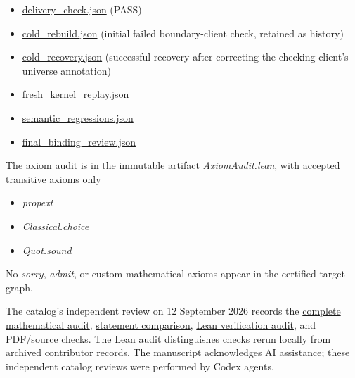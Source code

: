 \documentclass[11pt,a4paper]{article}
\providecommand{\tightlist}{\setlength{\itemsep}{0pt}\setlength{\parskip}{0pt}}
\begin{document}
\begin{itemize}
\tightlist
\item
  \href{https://github.com/yuningyang19/OpenProblemsInNLA_TR-01/blob/ed21181197ac839eac95f549404f94e7e3aa6e10/lean/audit/delivery_check.json}{delivery\_check.json}
  (PASS)
\item
  \href{https://github.com/yuningyang19/OpenProblemsInNLA_TR-01/blob/ed21181197ac839eac95f549404f94e7e3aa6e10/lean/audit/cold_rebuild.json}{cold\_rebuild.json}
  (initial failed boundary-client check, retained as history)
\item
  \href{https://github.com/yuningyang19/OpenProblemsInNLA_TR-01/blob/ed21181197ac839eac95f549404f94e7e3aa6e10/lean/audit/cold_recovery.json}{cold\_recovery.json}
  (successful recovery after correcting the checking client's universe
  annotation)
\item
  \href{https://github.com/yuningyang19/OpenProblemsInNLA_TR-01/blob/ed21181197ac839eac95f549404f94e7e3aa6e10/lean/audit/fresh_kernel_replay.json}{fresh\_kernel\_replay.json}
\item
  \href{https://github.com/yuningyang19/OpenProblemsInNLA_TR-01/blob/ed21181197ac839eac95f549404f94e7e3aa6e10/lean/audit/semantic_regressions.json}{semantic\_regressions.json}
\item
  \href{https://github.com/yuningyang19/OpenProblemsInNLA_TR-01/blob/ed21181197ac839eac95f549404f94e7e3aa6e10/lean/audit/final_binding_review.json}{final\_binding\_review.json}
\end{itemize}

The axiom audit is in the immutable artifact
\href{https://github.com/yuningyang19/OpenProblemsInNLA_TR-01/blob/ed21181197ac839eac95f549404f94e7e3aa6e10/lean/Problem56/PaperV7/AxiomAudit.lean}{\textit{AxiomAudit.lean}},
with accepted transitive axioms only

\begin{itemize}
\tightlist
\item
  \textit{propext}
\item
  \textit{Classical.choice}
\item
  \textit{Quot.sound}
\end{itemize}

No \textit{sorry}, \textit{admit}, or custom mathematical axioms appear
in the certified target graph.

The catalog's independent review on 12 September 2026 records the
\href{https://github.com/ajt60gaibb/OpenProblemsInNLA/blob/main/references/maintainer-review-2026-09-12-tr01/pr141-review.md}{complete
mathematical audit},
\href{https://github.com/ajt60gaibb/OpenProblemsInNLA/blob/main/references/maintainer-review-2026-09-12-tr01/pr141-statement-review.md}{statement
comparison},
\href{https://github.com/ajt60gaibb/OpenProblemsInNLA/blob/main/references/maintainer-review-2026-09-12-tr01/pr141-lean-review.md}{Lean
verification audit}, and
\href{https://github.com/ajt60gaibb/OpenProblemsInNLA/blob/main/references/maintainer-review-2026-09-12-tr01/pr141-pdf-qa.md}{PDF/source
checks}. The Lean audit distinguishes checks rerun locally from archived
contributor records. The manuscript acknowledges AI assistance; these
independent catalog reviews were performed by Codex agents.
\end{document}
